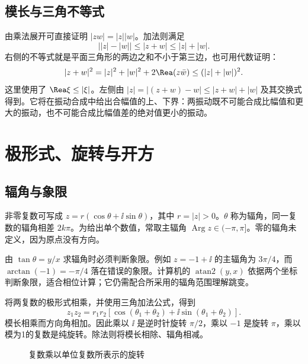 \documentclass[11pt,openany,fontset=fandol]{ctexbook}
\theoremstyle{plain}\newtheorem{theorem}{定理}[chapter]\newtheorem{proposition}[theorem]{命题}
\theoremstyle{definition}\newtheorem{definition}{定义}[chapter]\newtheorem{example}{例}[chapter]
\theoremstyle{remark}\newtheorem*{remark}{说明}
\newcommand{\Arg}{\operatorname{Arg}}\newcommand{\rank}{\operatorname{rank}}
\newcommand{\atan}{\operatorname{atan2}}\newcommand{\Res}{\operatorname{Res}}
\begin{document}
\subsection{模长与三角不等式}
由乘法展开可直接证明 $|zw|=|z||w|$。加法则满足
\begin{equation}
\bigl||z|-|w|\bigr|\le |z+w|\le |z|+|w|.
\end{equation}
右侧的不等式就是平面三角形的两边之和不小于第三边，也可用代数证明：
\[
|z+w|^2=|z|^2+|w|^2+2\Rea(z\bar w)
\le(|z|+|w|)^2.
\]
这里使用了 $\Rea\xi\le|\xi|$。左侧由 $|z|=|(z+w)-w|\le|z+w|+|w|$ 及其交换式得到。它将在振动合成中给出合幅值的上、下界：两振动既不可能合成比幅值和更大的振动，也不可能合成比幅值差的绝对值更小的振动。

\section{极形式、旋转与开方}
\subsection{辐角与象限}
非零复数可写成 $z=r(\cos\theta+\ii\sin\theta)$，其中 $r=|z|>0$。$\theta$ 称为辐角，同一复数的辐角相差 $2k\pi$。为给出单个数值，常取主辐角 $\Arg z\in(-\pi,\pi]$。零的辐角未定义，因为原点没有方向。

由 $\tan\theta=y/x$ 求辐角时必须判断象限。例如 $z=-1+\ii$ 的主辐角为 $3\pi/4$，而 $\arctan(-1)=-\pi/4$ 落在错误的象限。计算机的 $\atan(y,x)$ 依据两个坐标判断象限，适合相位计算；它仍需配合所采用的辐角范围理解跳变。

将两复数的极形式相乘，并使用三角加法公式，得到
\begin{equation}
z_1z_2=r_1r_2[\cos(\theta_1+\theta_2)+\ii\sin(\theta_1+\theta_2)].
\end{equation}
模长相乘而方向角相加。因此乘以 $\ii$ 是逆时针旋转 $\pi/2$，乘以 $-1$ 是旋转 $\pi$，乘以模为1的复数是纯旋转。除法则将模长相除、辐角相减。

\begin{figure}[htbp]
\centering
{}
\caption{复数乘以单位复数所表示的旋转}\label{fig:complex-rotation}
\end{figure}
\end{document}
